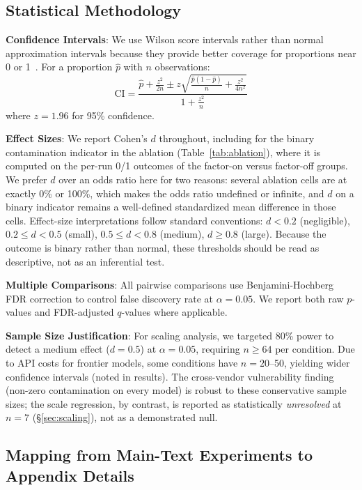 \documentclass{article}
\theoremstyle{plain}
\theoremstyle{definition}
\begin{document}
\subsection{Statistical Methodology}

\textbf{Confidence Intervals}: We use Wilson score intervals rather than normal approximation intervals because they provide better coverage for proportions near 0 or 1~\cite{wilson1927probable}. For a proportion $\hat{p}$ with $n$ observations:
\begin{equation}
\text{CI} = \frac{\hat{p} + \frac{z^2}{2n} \pm z\sqrt{\frac{\hat{p}(1-\hat{p})}{n} + \frac{z^2}{4n^2}}}{1 + \frac{z^2}{n}}
\end{equation}
where $z = 1.96$ for 95\% confidence.

\textbf{Effect Sizes}: We report Cohen's $d$ throughout, including for the binary contamination indicator in the ablation (Table~\ref{tab:ablation}), where it is computed on the per-run 0/1 outcomes of the factor-on versus factor-off groups. We prefer $d$ over an odds ratio here for two reasons: several ablation cells are at exactly 0\% or 100\%, which makes the odds ratio undefined or infinite, and $d$ on a binary indicator remains a well-defined standardized mean difference in those cells. Effect-size interpretations follow standard conventions: $d < 0.2$ (negligible), $0.2 \leq d < 0.5$ (small), $0.5 \leq d < 0.8$ (medium), $d \geq 0.8$ (large). Because the outcome is binary rather than normal, these thresholds should be read as descriptive, not as an inferential test.

\textbf{Multiple Comparisons}: All pairwise comparisons use Benjamini-Hochberg FDR correction to control false discovery rate at $\alpha = 0.05$. We report both raw $p$-values and FDR-adjusted $q$-values where applicable.

\textbf{Sample Size Justification}: For scaling analysis, we targeted 80\% power to detect a medium effect ($d = 0.5$) at $\alpha = 0.05$, requiring $n \geq 64$ per condition. Due to API costs for frontier models, some conditions have $n = 20$--50, yielding wider confidence intervals (noted in results). The cross-vendor vulnerability finding (non-zero contamination on every model) is robust to these conservative sample sizes; the scale regression, by contrast, is reported as statistically \emph{unresolved} at $n=7$ (\S\ref{sec:scaling}), not as a demonstrated null.

\subsection{Mapping from Main-Text Experiments to Appendix Details}
\label{sec:expmap}
\end{document}
